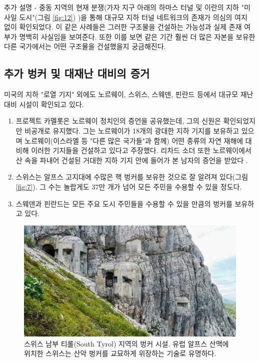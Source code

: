 \documentclass[10pt,twocolumn,letterpaper]{article}
\begin{document}
추가 설명 - 중동 지역의 현재 분쟁(가자 지구 아래의 하마스 터널\cite{38} 및 이란의 지하 "미사일 도시"(그림 \ref{fig:12}) \cite{39,40})을 통해 대규모 지하 터널 네트워크의 존재가 의심의 여지 없이 확인되었다. 이 같은 사례들은 그러한 구조물을 건설하는 가능성과 실제 존재 여부가 명백히 사실임을 보여준다. 또한 이를 보면 같은 기간 훨씬 더 많은 자본을 보유한 다른 국가에서는 어떤 구조물을 건설했을지 궁금해진다.

\subsection{추가 벙커 및 대재난 대비의 증거}

미국의 지하 "로열 기지" 외에도 노르웨이, 스위스, 스웨덴, 핀란드 등에서 대규모 재난 대비 시설이 확인되고 있다.

\begin{flushleft}
\begin{enumerate}
    \item 프로젝트 카멜롯은 노르웨이 정치인의 증언\cite{25,26}을 공유했는데, 그의 신원은 확인되었지만 비공개로 유지했다. 그는 노르웨이가 18개의 광대한 지하 기지를 보유하고 있으며 노르웨이(이스라엘 등 "다른 많은 국가들"과 함께) 어떤 종류의 자연 재해에 대비해 이러한 기지들을 건설하고 있다고 주장했다. 리차드 소더 또한 노르웨이에서 산 속을 파내어 건설된 거대한 지하 기지 안에 들어가 본 남자의 증언을 받았다 \cite{22}.
    \item 스위스는 알프스 고지대에 수많은 핵 벙커를 보유한 것으로 잘 알려져 있다(그림 \ref{fig:7}). 그 수는 놀랍게도 37만 개가 넘어 모든 주민을 수용할 수 있을 정도다\cite{27}.
    \item 스웨덴과 핀란드는 모든 주요 도시 주민들을 수용할 수 있을 만큼의 벙커를 보유하고 있다\cite{27}.
\end{enumerate}
\end{flushleft}

\begin{figure}[t]
\begin{center}
   \includegraphics[width=1\linewidth]{tyrol.jpg}
\end{center}
   \caption{스위스 남부 티롤(South Tyrol) 지역의 벙커 시설. 유럽 알프스 산맥에 위치한 스위스는 산악 벙커를 교묘하게 위장하는 기술로 유명하다\cite{32}.}
\label{fig:7}
\label{fig:onecol}
\end{figure}
\end{document}
